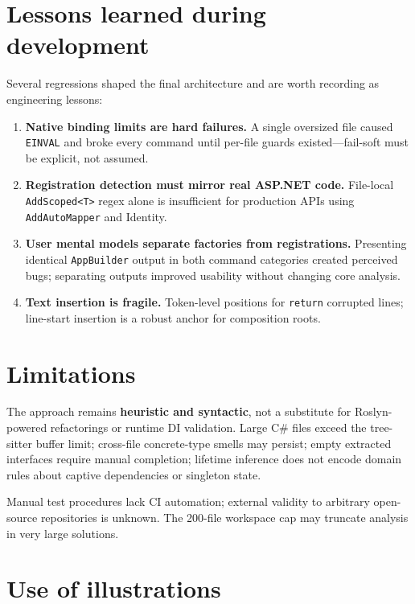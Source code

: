 \section{Lessons learned during development}

Several regressions shaped the final architecture and are worth recording as engineering lessons:

\begin{enumerate}
	\item \textbf{Native binding limits are hard failures.} A single oversized file caused \texttt{EINVAL} and broke every command until per-file guards existed---fail-soft must be explicit, not assumed.
	\item \textbf{Registration detection must mirror real ASP.NET code.} File-local \texttt{AddScoped<T>} regex alone is insufficient for production APIs using \texttt{AddAutoMapper} and Identity.
	\item \textbf{User mental models separate factories from registrations.} Presenting identical \texttt{AppBuilder} output in both command categories created perceived bugs; separating outputs improved usability without changing core analysis.
	\item \textbf{Text insertion is fragile.} Token-level positions for \texttt{return} corrupted lines; line-start insertion is a robust anchor for composition roots.
\end{enumerate}

\section{Limitations}

The approach remains \textbf{heuristic and syntactic}, not a substitute for Roslyn-powered refactorings or runtime DI validation. Large C\# files exceed the tree-sitter buffer limit; cross-file concrete-type smells may persist; empty extracted interfaces require manual completion; lifetime inference does not encode domain rules about captive dependencies or singleton state.

Manual test procedures lack CI automation; external validity to arbitrary open-source repositories is unknown. The 200-file workspace cap may truncate analysis in very large solutions.

\section{Use of illustrations}

